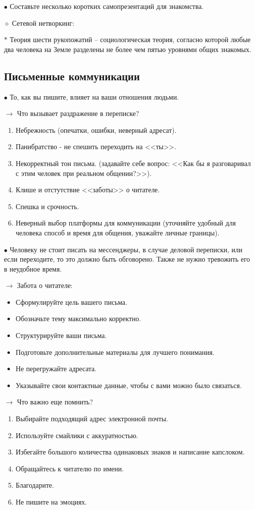 \documentclass[12pt,a4paper]{report}
\begin{document}
\smallskip 
$\bullet$ Составьте несколько коротких самопрезентаций для знакомства.

\bigskip
$\diamond$ Сетевой нетворкинг: 

\smallskip
$\ast$ Теория шести рукопожатий -- социологическая теория, согласно которой любые два человека на Земле разделены не более чем пятью уровнями общих знакомых.


\subsection*{Письменные коммуникации}
$\bullet$ То, как вы пишите, влияет на ваши отношения людьми.

\bigskip
$\rightarrow$ Что вызывает раздражение в переписке?
\begin{enumerate}
	\item Небрежность (опечатки, ошибки, неверный адресат).
	\item Панибратство - не спешить переходить на <<ты>>.
	\item Некорректный тон письма. (задавайте себе вопрос: <<Как бы я разговаривал с этим человек при реальном общении?>>).
	\item Клише и отстутствие <<заботы>> о читателе.
	\item Спешка и срочность.
	\item Неверный выбор платформы для коммуникации (уточняйте удобный для человека способ и время для общения, уважайте личные границы).
\end{enumerate}

$\bullet$ Человеку не стоит писать на мессенджеры, в случае деловой переписки, или если переходите, то это должно быть обговорено. Также не нужно тревожить его в неудобное время.

\newpage
\medskip
$\rightarrow$ Забота о читателе:
\begin{itemize}
	\item Сформулируйте цель вашего письма.
	\item Обозначьте тему максимально корректно.
	\item Структурируйте ваши письма.
	\item Подготовьте дополнительные материалы для лучшего понимания.
	\item Не перегружайте адресата.
	\item Указывайте свои контактные данные, чтобы с вами можно было связаться.
\end{itemize}

\medskip 
$\rightarrow$ Что важно еще помнить?
\begin{enumerate}
	\item Выбирайте подходящий адрес электронной почты.
	\item Используйте смайлики с аккуратностью.
	\item Избегайте большого количества одинаковых знаков и написание капслоком.
	\item Обращайтесь к читателю по имени.
	\item Благодарите.
	\item Не пишите на эмоциях.
\end{enumerate}
\end{document}
